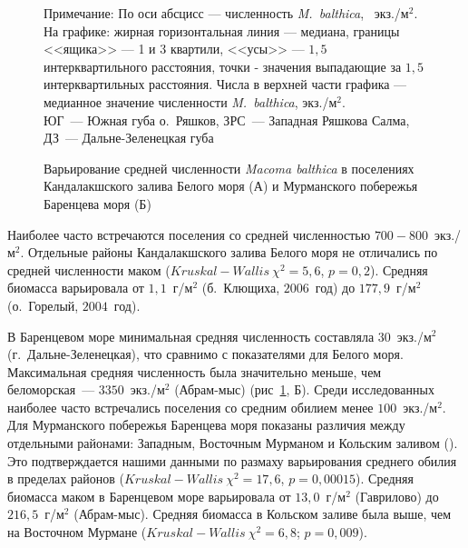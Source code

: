 {\begin{figure}[ht]
\begin{minipage}[]{.48\linewidth}
\begin{center}
	\end{center}
	\end{minipage}
	\hfill
	\caption{Варьирование средней численности {\it Macoma balthica} в поселениях Кандалакшского залива Белого моря (А) и Мурманского побережья Баренцева моря (Б)}
	{\footnotesize Примечание: По оси абсцисс --- численность {\it M.~balthica}, ~экз./м$^2$.\\
	На графике: жирная горизонтальная линия --- медиана, границы <<ящика>> --- 1 и 3 квартили, <<усы>> --- $1,5$ интерквартильного расстояния, точки - значения выпадающие за $1,5$ интерквартильных расстояния.
Числа в верхней части графика --- медианное значение численности {\it M.~balthica}, экз./м$^2$.\\
 ЮГ~--- Южная губа о.~Ряшков, ЗРС~--- Западная Ряшкова Салма, ДЗ~--- Дальне-Зеленецкая губа}
	\label{ris:N_area}
	\end{figure}

Наиболее часто встречаются поселения со средней численностью $700-800$~экз./м$^2$.
Отдельные районы Кандалакшского залива Белого моря не отличались по средней численности маком ($Kruskal-Wallis\ \chi^2 = 5,6$, $p = 0,2$).
Средняя биомасса варьировала от $1,1$~г/м$^2$ (б.~Клющиха, $2006$~год) до $177,9$~г/м$^2$ (о.~Горелый, $2004$~год).

В Баренцевом море минимальная средняя численность составляла $30$~экз./м$^2$ (г.~Дальне-Зеленецкая), что сравнимо с показателями для Белого моря. 
Максимальная средняя численность была значительно меньше, чем беломорская~--- $3350$~экз./м$^2$ (Абрам-мыс) (рис~\ref{ris:N_area}, Б).
Среди исследованных наиболее часто встречались поселения со средним обилием менее $100$~экз./м$^2$.
Для Мурманского побережья Баренцева моря показаны различия между отдельными районами: Западным, Восточным Мурманом и Кольским заливом (\cite{Guryanova_Ushakov_1929, Guryanova_et_al_1930}). 
Это подтверждается нашими данными по размаху варьирования среднего обилия в пределах районов ($Kruskal-Wallis\ \chi^2 = 17,6$, $p = 0,00015$).
Средняя биомасса маком в Баренцевом море варьировала от $13,0$~г/м$^2$ (Гаврилово) до $216,5$~г/м$^2$ (Абрам-мыс). 
Средняя биомасса в Кольском заливе была выше, чем на Восточном Мурмане ($Kruskal-Wallis~\chi^2 = 6,8$; $p = 0,009$).

}

